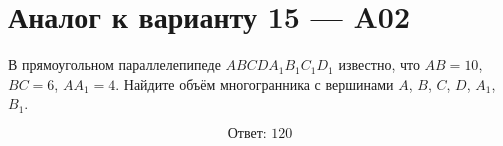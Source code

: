 \documentclass[12pt,a4paper]{article}
\begin{document}
\section*{Аналог к варианту 15 — A02}

В прямоугольном параллелепипеде \(ABCDA_1B_1C_1D_1\) известно, что \(AB=10\), \(BC=6\), \(AA_1=4\). Найдите объём многогранника с вершинами \(A\), \(B\), \(C\), \(D\), \(A_1\), \(B_1\).

\begin{center}
\end{center}

\[
\boxed{\text{Ответ: }120}
\]
\end{document}
